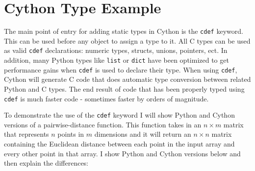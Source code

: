   \section{Cython Type Example} \label{app:cython_type_example}
    The main point of entry for adding static types in Cython is the \texttt{cdef} keyword. This can be used before any object to assign a type to it. All C types can be used as valid \texttt{cdef} declarations: numeric types, structs, unions, pointers, ect. In addition, many Python types like \texttt{list} or \texttt{dict} have been optimized to get performance gains when \texttt{cdef} is used to declare their type. When using \texttt{cdef}, Cython will generate C code that does automatic type conversion between related Python and C types. The end result of code that has been properly typed using \texttt{cdef} is much faster code - sometimes faster by orders of magnitude.

    To demonstrate the use of the \texttt{cdef} keyword I will show Python and Cython versions of a pairwise-distance function. This function takes in an $n \times m$ matrix that represents $n$ points in $m$ dimensions and it will return an $n \times n$ matrix containing the Euclidean distance between each point in the input array and every other point in that array. I show Python and Cython versions below and then explain the differences:

    \vspace{.2in}
    
    

